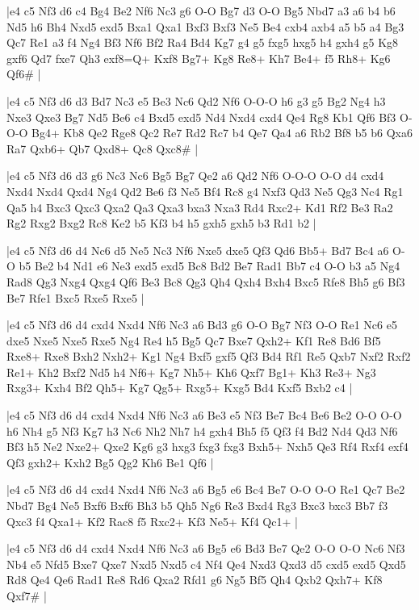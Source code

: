 \whitename{}
\blackname{}
\makegametitle
|e4 c5 Nf3 d6 c4 Bg4 Be2 Nf6 Nc3 g6 O-O Bg7 d3 O-O Bg5 Nbd7 a3 a6 b4 b6 Nd5 h6 Bh4 Nxd5 exd5 Bxa1 Qxa1 Bxf3 Bxf3 Ne5 Be4 cxb4 axb4 a5 b5 a4 Bg3 Qc7 Re1 a3 f4 Ng4 Bf3 Nf6 Bf2 Ra4 Bd4 Kg7 g4 g5 fxg5 hxg5 h4 gxh4 g5 Kg8 gxf6 Qd7 fxe7 Qh3 exf8=Q+ Kxf8 Bg7+ Kg8 Re8+ Kh7 Be4+ f5 Rh8+ Kg6 Qf6\#  |

\whitename{}
\blackname{}
\makegametitle
|e4 c5 Nf3 d6 d3 Bd7 Nc3 e5 Be3 Nc6 Qd2 Nf6 O-O-O h6 g3 g5 Bg2 Ng4 h3 Nxe3 Qxe3 Bg7 Nd5 Be6 c4 Bxd5 exd5 Nd4 Nxd4 cxd4 Qe4 Rg8 Kb1 Qf6 Bf3 O-O-O Bg4+ Kb8 Qe2 Rge8 Qc2 Re7 Rd2 Rc7 b4 Qe7 Qa4 a6 Rb2 Bf8 b5 b6 Qxa6 Ra7 Qxb6+ Qb7 Qxd8+ Qc8 Qxc8\#  |

\whitename{}
\blackname{}
\makegametitle
|e4 c5 Nf3 d6 d3 g6 Nc3 Nc6 Bg5 Bg7 Qe2 a6 Qd2 Nf6 O-O-O O-O d4 cxd4 Nxd4 Nxd4 Qxd4 Ng4 Qd2 Be6 f3 Ne5 Bf4 Rc8 g4 Nxf3 Qd3 Ne5 Qg3 Nc4 Rg1 Qa5 h4 Bxc3 Qxc3 Qxa2 Qa3 Qxa3 bxa3 Nxa3 Rd4 Rxc2+ Kd1 Rf2 Be3 Ra2 Rg2 Rxg2 Bxg2 Rc8 Ke2 b5 Kf3 b4 h5 gxh5 gxh5 b3 Rd1 b2  |

\whitename{}
\blackname{}
\makegametitle
|e4 c5 Nf3 d6 d4 Nc6 d5 Ne5 Nc3 Nf6 Nxe5 dxe5 Qf3 Qd6 Bb5+ Bd7 Bc4 a6 O-O b5 Be2 b4 Nd1 e6 Ne3 exd5 exd5 Bc8 Bd2 Be7 Rad1 Bb7 c4 O-O b3 a5 Ng4 Rad8 Qg3 Nxg4 Qxg4 Qf6 Be3 Bc8 Qg3 Qh4 Qxh4 Bxh4 Bxc5 Rfe8 Bh5 g6 Bf3 Be7 Rfe1 Bxc5 Rxe5 Rxe5  |

\whitename{}
\blackname{}
\makegametitle
|e4 c5 Nf3 d6 d4 cxd4 Nxd4 Nf6 Nc3 a6 Bd3 g6 O-O Bg7 Nf3 O-O Re1 Nc6 e5 dxe5 Nxe5 Nxe5 Rxe5 Ng4 Re4 h5 Bg5 Qc7 Bxe7 Qxh2+ Kf1 Re8 Bd6 Bf5 Rxe8+ Rxe8 Bxh2 Nxh2+ Kg1 Ng4 Bxf5 gxf5 Qf3 Bd4 Rf1 Re5 Qxb7 Nxf2 Rxf2 Re1+ Kh2 Bxf2 Nd5 h4 Nf6+ Kg7 Nh5+ Kh6 Qxf7 Bg1+ Kh3 Re3+ Ng3 Rxg3+ Kxh4 Bf2 Qh5+ Kg7 Qg5+ Rxg5+ Kxg5 Bd4 Kxf5 Bxb2 c4  |

\whitename{}
\blackname{}
\makegametitle
|e4 c5 Nf3 d6 d4 cxd4 Nxd4 Nf6 Nc3 a6 Be3 e5 Nf3 Be7 Bc4 Be6 Be2 O-O O-O h6 Nh4 g5 Nf3 Kg7 h3 Nc6 Nh2 Nh7 h4 gxh4 Bh5 f5 Qf3 f4 Bd2 Nd4 Qd3 Nf6 Bf3 h5 Ne2 Nxe2+ Qxe2 Kg6 g3 hxg3 fxg3 fxg3 Bxh5+ Nxh5 Qe3 Rf4 Rxf4 exf4 Qf3 gxh2+ Kxh2 Bg5 Qg2 Kh6 Be1 Qf6  |

\whitename{}
\blackname{}
\makegametitle
|e4 c5 Nf3 d6 d4 cxd4 Nxd4 Nf6 Nc3 a6 Bg5 e6 Bc4 Be7 O-O O-O Re1 Qc7 Be2 Nbd7 Bg4 Ne5 Bxf6 Bxf6 Bh3 b5 Qh5 Ng6 Re3 Bxd4 Rg3 Bxc3 bxc3 Bb7 f3 Qxc3 f4 Qxa1+ Kf2 Rac8 f5 Rxc2+ Kf3 Ne5+ Kf4 Qc1+  |

\whitename{}
\blackname{}
\makegametitle
|e4 c5 Nf3 d6 d4 cxd4 Nxd4 Nf6 Nc3 a6 Bg5 e6 Bd3 Be7 Qe2 O-O O-O Nc6 Nf3 Nb4 e5 Nfd5 Bxe7 Qxe7 Nxd5 Nxd5 c4 Nf4 Qe4 Nxd3 Qxd3 d5 cxd5 exd5 Qxd5 Rd8 Qe4 Qe6 Rad1 Re8 Rd6 Qxa2 Rfd1 g6 Ng5 Bf5 Qh4 Qxb2 Qxh7+ Kf8 Qxf7\#  |

